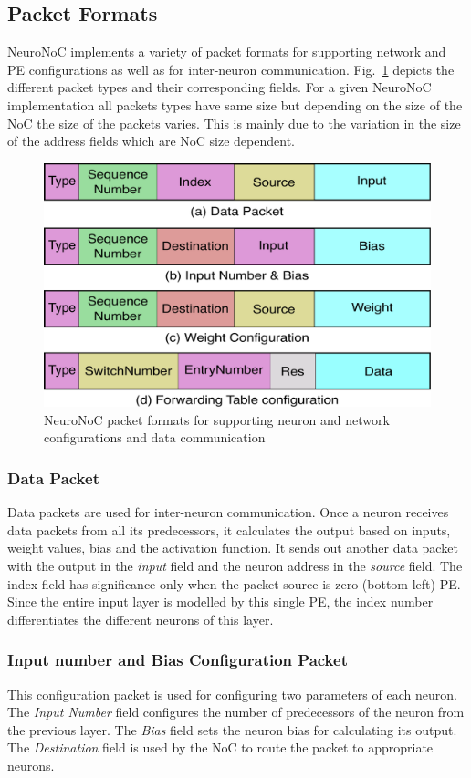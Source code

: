 \subsection{Packet Formats}
\label{subsecpktformat}
NeuroNoC implements a variety of packet formats for supporting network and PE configurations as well as for inter-neuron communication.  
Fig.~\ref{figure:pktformat} depicts the different packet types and their corresponding fields.
For a given NeuroNoC implementation all packets types have same size but depending on the size of the NoC the size of the packets varies.
This is mainly due to the variation in the size of the address fields which are NoC size dependent. 
\begin{figure}[t!]
    \includegraphics[width=0.8\columnwidth]{Figures/pktformat.pdf}
    \caption{NeuroNoC packet formats for supporting neuron and network configurations and data communication} 
    \label{figure:pktformat}
\end{figure}

\subsubsection*{\bf Data Packet}
Data packets are used for inter-neuron communication.
Once a neuron receives data packets from all its predecessors, it calculates the output based on inputs, weight values, bias and the activation function.
It sends out another data packet with the output in the \emph{input} field and the neuron address in the \emph{source} field.
The index field has significance only when the packet source is zero (bottom-left) PE.
Since the entire input layer is modelled by this single PE, the index number differentiates the different neurons of this layer.
\subsubsection*{\bf Input number and Bias Configuration Packet}
This configuration packet is used for configuring two parameters of each neuron.
The \emph{Input Number} field configures the number of predecessors of the neuron from the previous layer.
The \emph{Bias} field sets the neuron bias for calculating its output.
The \emph{Destination} field is used by the NoC to route the packet to appropriate neurons. 

